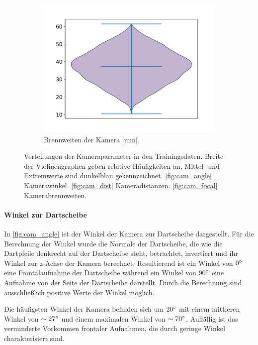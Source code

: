 \begin{figure}
    \begin{subfigure}{0.475\textwidth}
        \centering
        \includegraphics[width=\textwidth]{imgs/rendering/ergebnisse/cam_focal.pdf}
        \caption{Brennweiten der Kamera [mm].}
        \label{fig:cam_focal}
    \end{subfigure}
    \caption{Verteilungen der Kameraparameter in den Trainingsdaten. Breite der Violinengraphen geben relative Häufigkeiten an, Mittel- und Extremwerte sind dunkelblau gekennzeichnet. \autoref{fig:cam_angle} Kamerawinkel. \autoref{fig:cam_dist} Kameradistanzen. \autoref{fig:cam_focal} Kamerabrennweiten.}
    \label{img:kamera_meta}
\end{figure}

\paragraph{Winkel zur Dartscheibe}

In \autoref{fig:cam_angle} ist der Winkel der Kamera zur Dartscheibe dargestellt. Für die Berechnung der Winkel wurde die Normale der Dartscheibe, die wie die Dartpfeile denkrecht auf der Dartscheibe steht, betrachtet, invertiert und ihr Winkel zur z-Achse der Kamera berechnet. Resultierend ist ein Winkel von $0^{\circ}$ eine Frontalaufnahme der Dartscheibe während ein Winkel von $90^{\circ}$ eine Aufnahme von der Seite der Dartscheibe darstellt. Durch die Berechnung sind ausschließlich positive Werte der Winkel möglich.

Die häufigsten Winkel der Kamera befinden sich um $20^{\circ}$ mit einem mittleren Winkel von $\sim27^{\circ}$ und einem maximalen Winkel von $\sim70^{\circ}$. Auffällig ist das verminderte Vorkommen frontaler Aufnahmen, die durch geringe Winkel charakterisiert sind.


